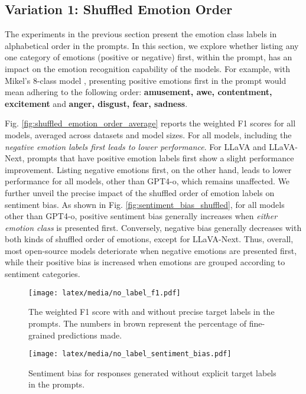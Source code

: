 \subsection{Variation 1: Shuffled Emotion Order}
\label{sec:shuffled_emotion}

The experiments in the previous section present the emotion class labels in alphabetical order in the prompts. In this section, we explore whether listing any one category of emotions (positive or negative) first, within the prompt, has an impact on the emotion recognition capability of the models. For example, with Mikel's 8-class model \cite{mikels2005emotional}, presenting positive emotions first in the prompt would mean adhering to the following order: \textbf{amusement, awe, contentment, excitement} and \textbf{anger, disgust, fear, sadness}.

Fig. \ref{fig:shuffled_emotion_order_average} reports the weighted F1 scores for all models, averaged across datasets and model sizes. For all models, including the \textit{negative emotion labels first leads to lower performance}. For LLaVA and LLaVA-Next, prompts that have positive emotion labels first show a slight performance improvement. Listing negative emotions first, on the other hand, leads to lower performance for all models, other than GPT4-o, which remains unaffected. We further unveil the precise impact of the shuffled order of emotion labels on sentiment bias. As shown in Fig. \ref{fig:sentiment_bias_shuffled}, for all models other than GPT4-o, positive sentiment bias generally increases when \textit{either emotion class} is presented first. Conversely, negative bias generally decreases with both kinds of shuffled order of emotions, except for LLaVA-Next. Thus, overall, most open-source models deteriorate when negative emotions are presented first, while their positive bias is increased when emotions are grouped according to sentiment categories. 

\begin{figure}[t]
    \centering
    \texttt{[image: latex/media/no\_label\_f1.pdf]}
    \caption{The weighted F1 score with and without precise target labels in the prompts. The numbers in brown represent the percentage of fine-grained predictions made.}
    \label{fig:no_label_f1}
\end{figure}

\begin{figure}[t]
    \centering
    \texttt{[image: latex/media/no\_label\_sentiment\_bias.pdf]}
    \caption{Sentiment bias for responses generated without explicit target labels in the prompts.}
    \label{fig:no_label_sentiment_bias}
\end{figure}


